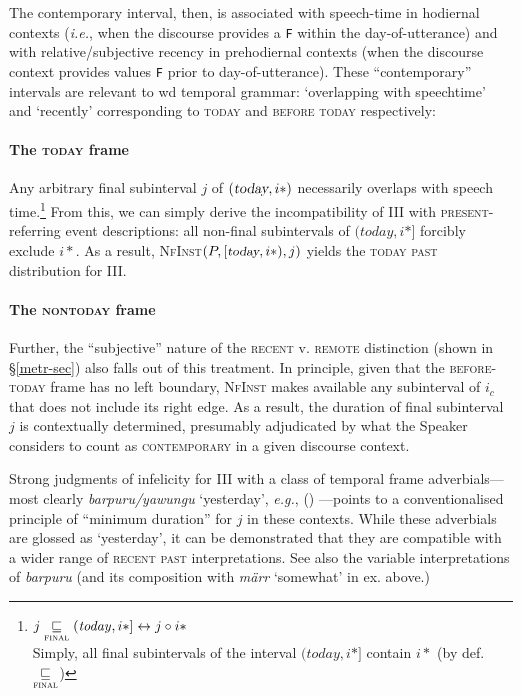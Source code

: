 The contemporary interval, then, is associated with speech-time in hodiernal contexts (\textit{i.e.}, when the discourse provides a \texttt{F} within the day-of-utterance) and with relative/subjective recency in prehodiernal contexts (when the discourse context provides values \texttt{F} prior to day-of-utterance). These ``contemporary'' intervals are relevant to \gls{wd} temporal grammar: `overlapping with speechtime' and `recently' corresponding to \textsc{today} and \textsc{before today} respectively:


\paragraph[Hodiernal]{The \textsc{today} frame} Any arbitrary final subinterval $ j $ of $ (\textsl{today},i*) $ necessarily overlaps with speech time.\footnote{
	$ j \underset{\textsc{final}}{\sqsubseteq}(\mathit{today},i*]\leftrightarrow j\circ i*$\\
	Simply, all final subintervals of the interval $ (\textit{today},i*] $ contain $ i* $ (by def. $ \underset{\textsc{final}}{\sqsubseteq} $)
}
From this, we can simply derive the incompatibility of \gls{III} with \textsc{present}-referring event descriptions: all non-final subintervals of $ (\textit{today}, i*] $ forcibly exclude $ i* $. %
 As a result, \textsc{NfInst}$ (P,{\small [\textsl{today},i*)},j) $ yields the \textsc{today past }distribution for \gls{III}.

\paragraph[Prehodiernal]{The \textsc{nontoday} frame} Further, the ``subjective'' nature of the \textsc{recent} v. \textsc{remote} distinction (shown in §\ref{metr-sec}) also falls out of this treatment. In principle, given that the \textsc{before-today} frame has no left boundary, \textsc{NfInst} makes available any subinterval of $ i_c $ that does not include its right edge. As a result, the duration of final subinterval $ j $ is contextually determined, presumably adjudicated by what the Speaker considers to count as \textsc{contemporary} in a given discourse context. 


Strong judgments of infelicity for \gls{III} with a class of temporal frame adverbials---most clearly \textit{barpuru\slash yawungu} `yesterday', \textit{e.g.}, () ---points to a conventionalised principle of ``minimum duration'' for $ j $ in these contexts. While these adverbials are glossed as `yesterday', it can be demonstrated that they are compatible with a wider range of \textsc{recent past} interpretations. See also the variable interpretations of \textit{barpuru} (and its composition with \textit{märr} `somewhat' in ex.  above.)




